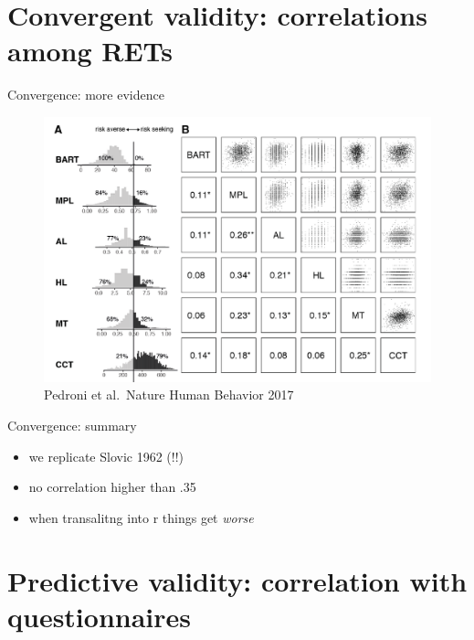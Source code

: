 \documentclass[
  ignorenonframetext,
]{beamer}
\begin{document}
\hypertarget{convergent-validity-correlations-among-rets}{%
\section{\texorpdfstring{Convergent validity: \textbf{correlations}
among
RETs}{Convergent validity: correlations among RETs}}\label{convergent-validity-correlations-among-rets}}

\begin{frame}{Convergence: more evidence}
\protect\hypertarget{convergence-more-evidence}{}

\begin{figure}
\centering
\includegraphics[width=6.77083in,height=\textheight]{NHB_correlation.png}
\caption{Pedroni et al.~Nature Human Behavior 2017}
\end{figure}

\end{frame}

\begin{frame}{Convergence: summary}
\protect\hypertarget{convergence-summary}{}

\begin{itemize}
\item
  we replicate Slovic 1962 (!!)
\item
  no correlation higher than .35
\item
  when transalitng into r things get \emph{worse}
\end{itemize}

\end{frame}

\hypertarget{predictive-validity-correlation-with-questionnaires}{%
\section{Predictive validity: correlation with
questionnaires}\label{predictive-validity-correlation-with-questionnaires}}
\end{document}
